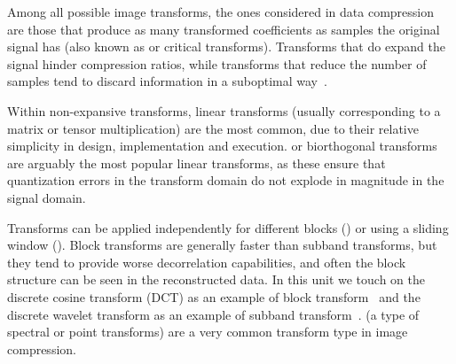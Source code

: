 Among all possible image transforms, the ones considered in data compression are those that produce as many transformed
coeﬃcients as samples the original signal has (also known as  or critical transforms). Transforms that do expand the signal hinder compression ratios, while transforms that reduce the number of samples tend to discard information in a suboptimal way~\cite[\S 4.1.1]{taubman2002jpeg2000}.

Within non-expansive transforms, linear transforms (usually corresponding to a matrix or tensor multiplication) are the most common, due to their relative simplicity in design, implementation and execution.  or biorthogonal transforms are arguably the most popular linear transforms, as these ensure that quantization errors in the transform domain do not explode in magnitude in the signal domain.

Transforms can be applied independently for different blocks () or using a sliding window (). Block transforms are generally faster than subband transforms, but they tend to provide worse decorrelation capabilities, and often the block structure can be seen in the reconstructed data. In this unit we touch on the discrete cosine transform (DCT) as an example of block transform~\cite[\S 13.4.1, \S 13.4.2, \S 13.3]{sayood_introduction} and the discrete wavelet transform as an example of subband transform~\cite[\S 14.1, \S 14.2, \S 14.3, \S 14.4, \S 14.8, \S 15.1, \S 15.2, \S 16]{sayood_introduction}\cite[\S 6.2]{taubman2002jpeg2000}.  (a type of spectral or point transforms) are a very common transform type in image compression.


